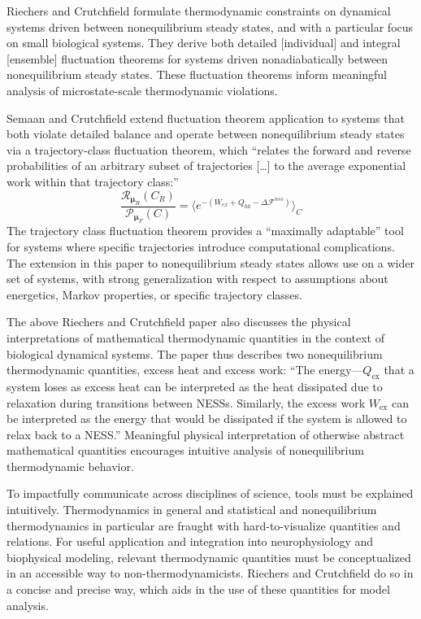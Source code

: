 \documentclass[%
 aip,
 amsmath,amssymb,
 reprint,%
]{revtex4-1}
\begin{document}
Riechers and Crutchfield formulate thermodynamic constraints on dynamical systems driven between nonequilibrium steady states, and with a particular focus on small biological systems. They derive both detailed [individual] and integral [ensemble] fluctuation theorems for systems driven nonadiabatically between nonequilibrium steady states.\cite{REIC2017} These fluctuation theorems inform meaningful analysis of microstate-scale thermodynamic violations.

Semaan and Crutchfield extend fluctuation theorem application to systems that both violate detailed balance and operate between nonequilibrium steady states via a trajectory-class fluctuation theorem, which ``relates the forward and reverse probabilities of an arbitrary subset of trajectories […] to the average exponential work within that trajectory class:''\cite{SEMA2022}
\begin{equation}
    \frac{\mathcal{R}_{\mathbf{\mu}_R}(C_R)}{\mathcal{P}_{\mathbf{\mu}_F}(C)}=\langle e^{-(W_{ex}+Q_{hk}-\Delta \mathcal{F}^{nss})}\rangle_C
    \label{eq:tcft}
\end{equation}
The trajectory class fluctuation theorem provides a ``maximally adaptable'' tool for systems where specific trajectories introduce computational complications. The extension in this paper to nonequilibrium steady states allows use on a wider set of systems, with strong generalization with respect to assumptions about energetics, Markov properties, or specific trajectory classes.

The above Riechers and Crutchfield paper also discusses the physical interpretations of mathematical thermodynamic quantities in the context of biological dynamical systems. The paper thus describes two nonequilibrium thermodynamic quantities, excess heat and excess work: ``The energy---$Q_\mathrm{ex}$ that a system loses as excess heat can be interpreted as the heat dissipated due to relaxation during transitions between NESSs. Similarly, the excess work $W_\mathrm{ex}$ can be interpreted as the energy that would be dissipated if the system is allowed to relax back to a NESS.'' Meaningful physical interpretation of otherwise abstract mathematical quantities encourages intuitive analysis of nonequilibrium thermodynamic behavior.

To impactfully communicate across disciplines of science, tools must be explained intuitively. Thermodynamics in general and statistical and nonequilibrium thermodynamics in particular are fraught with hard-to-visualize quantities and relations. For useful application and integration into neurophysiology and biophysical modeling, relevant thermodynamic quantities must be conceptualized in an accessible way to non-thermodynamicists. Riechers and Crutchfield do so in a concise and precise way, which aids in the use of these quantities for model analysis.
\end{document}
